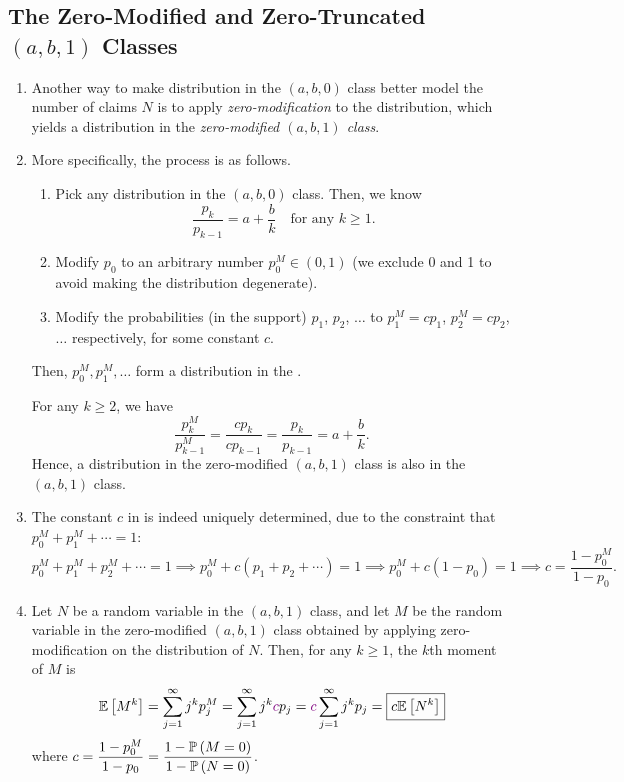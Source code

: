 \subsection{The Zero-Modified and Zero-Truncated \((a,b,1)\) Classes}
\begin{enumerate}
\item Another way to make distribution in the \((a,b,0)\) class better model
the number of claims \(N\) is to apply \emph{zero-modification} to the
distribution, which yields a distribution in the \emph{zero-modified
\((a,b,1)\) class}.
\item \label{it:zero-modify-process}
More specifically, the  process is as follows.
\begin{enumerate}
\item Pick any distribution in the \((a,b,0)\) class. Then, we know
\[
\frac{p_k}{p_{k-1}}=a+\frac{b}{k}\quad\text{for any \(k\ge 1\)}.
\]
\item Modify \(p_0\) to an arbitrary number \(p_0^{M}\in(0,1)\) (we exclude 0
and 1 to avoid making the distribution degenerate).
\item Modify the probabilities (in the support) \(p_1\), \(p_2\), \(\dotsc\) to
\(p_1^M=cp_1\), \(p_2^M=cp_2\),\(\dotsc\) respectively, for some constant
\(c\).
\end{enumerate}
Then, \(p_0^M,p_1^M,\dotsc\) form a distribution in the .

\begin{note}
For any \(k\ge 2\), we have
\[
\frac{p_k^M}{p_{k-1}^M}=\frac{cp_k}{cp_{k-1}}=\frac{p_k}{p_{k-1}}=a+\frac{b}{k}.
\]
Hence, a distribution in the zero-modified \((a,b,1)\) class is also in the
\((a,b,1)\) class.
\end{note}
\item \label{it:zm-const-c-fmla}
The constant \(c\) in  is indeed
uniquely determined, due to the constraint that \(p_0^M+p_1^M+\dotsb=1\):
\[
p_0^M+p_1^M+p_2^M+\dotsb=1
\implies
p_0^M+c(p_1+p_2+\dotsb)=1
\implies
p_0^M+c(1-p_0)=1
\implies
c=\boxed{\frac{1-p_0^M}{1-p_0}}.
\]
\item \label{it:zm-kth-moment}
Let \(N\) be a random variable in the \((a,b,1)\) class, and let \(M\) be
the random variable in the zero-modified \((a,b,1)\) class obtained by applying
zero-modification on the distribution of \(N\). Then, for any \(k\ge 1\), the
\(k\)th moment of \(M\) is
\[
\mathbb{E}\left[M^k\right]=\sum_{j=1}^{\infty}j^kp_j^M 
=\sum_{j=1}^{\infty}j^k {\color{violet}c}p_j
={\color{violet}c}\sum_{j=1}^{\infty}j^k p_j
=\boxed{c\mathbb{E}\left[N^k\right]}
\]
where \(\displaystyle c=\frac{1-p_0^M}{1-p_0}=\frac{1-\mathbb{P}\left(M=0\right)}{1-\mathbb{P}\left(N=0\right)}\).


\end{enumerate}
